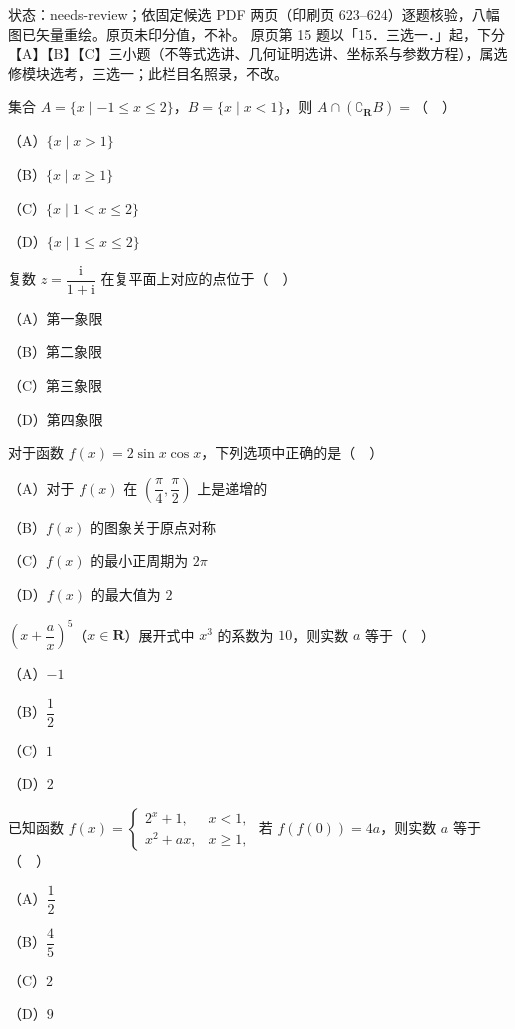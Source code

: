 状态：needs-review；依固定候选 PDF 两页（印刷页 623–624）逐题核验，八幅图已矢量重绘。原页未印分值，不补。
原页第 15 题以「15．三选一．」起，下分【A】【B】【C】三小题（不等式选讲、几何证明选讲、坐标系与参数方程），属选修模块选考，三选一；此栏目名照录，不改。
\begin{question}
集合 $A=\{x\mid -1\leqslant x\leqslant 2\}$，$B=\{x\mid x<1\}$，则 $A\cap(\complement_{\mathbf R}B)=$（　）

（A）$\{x\mid x>1\}$

（B）$\{x\mid x\geqslant 1\}$

（C）$\{x\mid 1<x\leqslant 2\}$

（D）$\{x\mid 1\leqslant x\leqslant 2\}$

\end{question}
\begin{question}
复数 $z=\dfrac{\mathrm i}{1+\mathrm i}$ 在复平面上对应的点位于（　）

（A）第一象限

（B）第二象限

（C）第三象限

（D）第四象限

\end{question}
\begin{question}
对于函数 $f(x)=2\sin x\cos x$，下列选项中正确的是（　）

（A）对于 $f(x)$ 在 $\left(\dfrac{\pi}{4},\dfrac{\pi}{2}\right)$ 上是递增的

（B）$f(x)$ 的图象关于原点对称

（C）$f(x)$ 的最小正周期为 $2\pi$

（D）$f(x)$ 的最大值为 $2$

\end{question}
\begin{question}
$\left(x+\dfrac{a}{x}\right)^5$（$x\in\mathbf R$）展开式中 $x^3$ 的系数为 $10$，则实数 $a$ 等于（　）

（A）$-1$

（B）$\dfrac12$

（C）$1$

（D）$2$

\end{question}
\begin{question}
已知函数 $f(x)=\begin{cases}2^x+1,&x<1,\\[2pt]x^2+ax,&x\geqslant 1,\end{cases}$ 若 $f(f(0))=4a$，则实数 $a$ 等于（　）

（A）$\dfrac12$

（B）$\dfrac45$

（C）$2$

（D）$9$

\Needspace{0.4\textheight}
\end{question}

